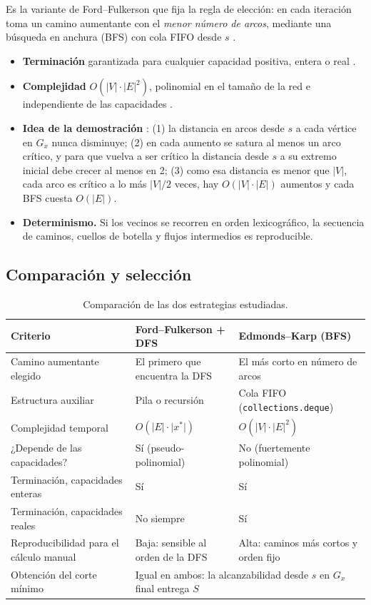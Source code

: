 \documentclass[12pt, a4paper]{article}
\begin{document}
Es la variante de Ford--Fulkerson que fija la regla de elección: en cada iteración toma un camino aumentante con el \emph{menor número de arcos}, mediante una búsqueda en anchura (BFS) con cola FIFO desde $s$ \cite{edmondskarp1972}.
\begin{itemize}
  \item \textbf{Terminación} garantizada para cualquier capacidad positiva, entera o real \cite{edmondskarp1972}.
  \item \textbf{Complejidad} $O(\lvert V\rvert \cdot \lvert E\rvert^2)$, polinomial en el tamaño de la red e independiente de las capacidades \cite{clrs2009, ahuja1993}.
  \item \textbf{Idea de la demostración} \cite{edmondskarp1972, clrs2009}: (1) la distancia en arcos desde $s$ a cada vértice en $G_x$ nunca disminuye; (2) en cada aumento se satura al menos un arco crítico, y para que vuelva a ser crítico la distancia desde $s$ a su extremo inicial debe crecer al menos en 2; (3) como esa distancia es menor que $\lvert V\rvert$, cada arco es crítico a lo más $\lvert V\rvert/2$ veces, hay $O(\lvert V\rvert\cdot\lvert E\rvert)$ aumentos y cada BFS cuesta $O(\lvert E\rvert)$.
  \item \textbf{Determinismo.} Si los vecinos se recorren en orden lexicográfico, la secuencia de caminos, cuellos de botella y flujos intermedios es reproducible.
\end{itemize}

\subsection{Comparación y selección}

\begin{table}[H]
  \centering
  \small
  \begin{tabular}{p{4.2cm}p{4.6cm}p{4.6cm}}
    \toprule
    \textbf{Criterio} & \textbf{Ford--Fulkerson + DFS} & \textbf{Edmonds--Karp (BFS)} \\
    \midrule
    Camino aumentante elegido & El primero que encuentra la DFS & El más corto en número de arcos \\
    Estructura auxiliar & Pila o recursión & Cola FIFO (\texttt{collections.deque}) \\
    Complejidad temporal & $O(\lvert E\rvert \cdot \lvert x^*\rvert)$ & $O(\lvert V\rvert \cdot \lvert E\rvert^2)$ \\
    ¿Depende de las capacidades? & Sí (pseudo-polinomial) & No (fuertemente polinomial) \\
    Terminación, capacidades enteras & Sí & Sí \\
    Terminación, capacidades reales & No siempre & Sí \\
    Reproducibilidad para el cálculo manual & Baja: sensible al orden de la DFS & Alta: caminos más cortos y orden fijo \\
    Obtención del corte mínimo & \multicolumn{2}{p{9.2cm}}{Igual en ambos: la alcanzabilidad desde $s$ en $G_x$ final entrega $S$} \\
    \bottomrule
  \end{tabular}
  \caption{Comparación de las dos estrategias estudiadas.}
  \label{tab:comparacion_alg}
\end{table}
\end{document}
